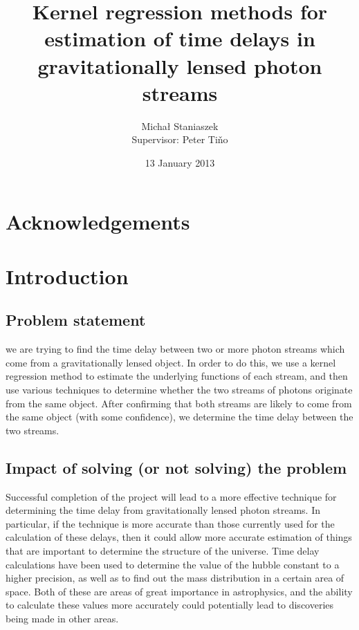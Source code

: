 \documentclass[11pt]{article}
\title{Kernel regression methods for estimation of time delays in gravitationally lensed photon streams}
\author{\Large{Micha{\l} Staniaszek} \\\small{Supervisor: Peter Tiňo}}
\date{13 January 2013}
\begin{document}
\maketitle

\setcounter{tocdepth}{3}
\tableofcontents
\vspace*{1cm}

\section{Acknowledgements}
\label{sec-1}

\section{Introduction}
\label{sec-2}

\subsection{Problem statement}
\label{sec-2.1}

   we are trying to find the time delay between two or more photon streams which come from a gravitationally lensed object. In order to do this, we use a kernel regression method to estimate the underlying functions of each stream, and then use various techniques to determine whether the two streams of photons originate from the same object. After confirming that both streams are likely to come from the same object (with some confidence), we determine the time delay between the two streams.
\subsection{Impact of solving (or not solving) the problem}
\label{sec-2.2}

   Successful completion of the project will lead to a more effective technique for determining the time delay from gravitationally lensed photon streams. In particular, if the technique is more accurate than those currently used for the calculation of these delays, then it could allow more accurate estimation of things that are important to determine the structure of the universe. Time delay calculations have been used to determine the value of the hubble constant to a higher precision, as well as to find out the mass distribution in a certain area of space. Both of these are areas of great importance in astrophysics, and the ability to calculate these values more accurately could potentially lead to discoveries being made in other areas.
\end{document}
